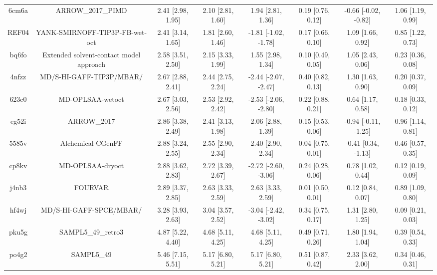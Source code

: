 \documentclass{article}
\begin{document}
\begin{center}
\begin{longtable}{|cccccccc|}
 6cm6a &                                  ARROW\_2017\_PIMD &  2.41 [2.98, 1.95] &  2.10 [2.81, 1.60] &     1.94 [2.81, 1.36] &  0.19 [0.76, 0.12] &  -0.66 [-0.02, -0.82] &     1.06 [1.19, 0.99] \\
 REF04 &                     YANK-SMIRNOFF-TIP3P-FB-wet-oct &  2.41 [3.14, 1.65] &  1.81 [2.60, 1.46] &  -1.81 [-1.02, -1.78] &  0.17 [0.66, 0.10] &     1.09 [1.66, 0.92] &     0.85 [1.22, 0.73] \\
 bq6fo &            Extended solvent-contact model approach &  2.58 [3.51, 2.50] &  2.15 [3.33, 1.99] &     1.55 [2.98, 1.34] &  0.10 [0.49, 0.05] &     1.05 [2.43, 0.06] &     0.23 [0.36, 0.08] \\
 4nfzz &                           MD/S-HI-GAFF-TIP3P/MBAR/ &  2.67 [2.88, 2.41] &  2.44 [2.75, 2.24] &  -2.44 [-2.07, -2.47] &  0.40 [0.82, 0.13] &     1.30 [1.63, 0.90] &     0.20 [0.37, 0.09] \\
 623c0 &                                   MD-OPLSAA-wetoct &  2.67 [3.03, 2.56] &  2.53 [2.92, 2.42] &  -2.53 [-2.06, -2.80] &  0.22 [0.88, 0.21] &     0.64 [1.17, 0.58] &     0.18 [0.33, 0.12] \\
 eg52i &                                        ARROW\_2017 &  2.86 [3.38, 2.49] &  2.41 [3.13, 1.98] &     2.06 [2.88, 1.39] &  0.15 [0.53, 0.06] &  -0.94 [-0.11, -1.25] &     0.96 [1.14, 0.81] \\
 5585v &                                  Alchemical-CGenFF &  2.88 [3.24, 2.55] &  2.55 [2.90, 2.34] &     2.40 [2.90, 2.34] &  0.04 [0.75, 0.01] &   -0.41 [0.34, -1.13] &     0.46 [0.57, 0.35] \\
 cp8kv &                                   MD-OPLSAA-dryoct &  2.88 [3.62, 2.83] &  2.72 [3.39, 2.67] &  -2.72 [-2.60, -3.06] &  0.24 [0.28, 0.06] &     0.78 [1.02, 0.44] &     0.12 [0.19, 0.09] \\
 j4nb3 &                                            FOURVAR &  2.89 [3.37, 2.85] &  2.63 [3.33, 2.59] &     2.63 [3.33, 2.59] &  0.01 [0.50, 0.01] &     0.12 [0.84, 0.07] &     0.89 [1.09, 0.80] \\
 hf4wj &                            MD/S-HI-GAFF-SPCE/MBAR/ &  3.28 [3.93, 2.63] &  3.04 [3.57, 2.52] &  -3.04 [-2.42, -3.02] &  0.34 [0.75, 0.17] &     1.31 [2.80, 1.25] &     0.09 [0.21, 0.03] \\
 pku5g &                                 SAMPL5\_49\_retro3 &  4.87 [5.22, 4.40] &  4.68 [5.11, 4.25] &     4.68 [5.11, 4.25] &  0.49 [0.71, 0.26] &     1.80 [1.94, 1.04] &     0.39 [0.54, 0.33] \\
 po4g2 &                                         SAMPL5\_49 &  5.46 [7.15, 5.51] &  5.17 [6.80, 5.21] &     5.17 [6.80, 5.21] &  0.51 [0.87, 0.42] &     2.33 [3.62, 2.00] &     0.34 [0.46, 0.31] \\
\end{longtable}
\end{center}
\end{document}
